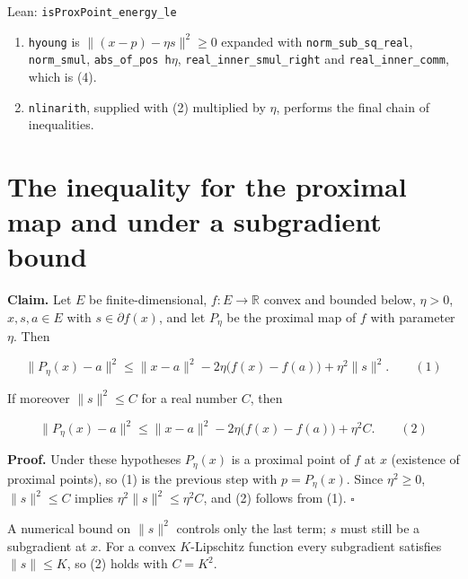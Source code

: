 \documentclass[11pt,a4paper]{article}
\begin{document}
\begin{leanbox}{Lean: \texttt{isProxPoint\_\allowbreak{}energy\_\allowbreak{}le}}
\begin{enumerate}
\item \texttt{hyoung} is \(\|(x-p)-\eta s\|^2\ge0\) expanded with \texttt{norm\_\allowbreak{}sub\_\allowbreak{}sq\_\allowbreak{}real}, \texttt{norm\_\allowbreak{}smul}, \texttt{abs\_\allowbreak{}of\_\allowbreak{}pos h\ensuremath{\eta}}, \texttt{real\_\allowbreak{}inner\_\allowbreak{}smul\_\allowbreak{}right} and \texttt{real\_\allowbreak{}inner\_\allowbreak{}comm}, which is (4).

\item \texttt{nlinarith}, supplied with (2) multiplied by \(\eta\), performs the final chain of inequalities.

\end{enumerate}
\end{leanbox}

\section{\texorpdfstring{The inequality for the proximal map and under a subgradient bound}{The inequality for the proximal map and under a subgradient bound}}


\textbf{Claim.} Let \(E\) be finite-dimensional, \(f:E\to\mathbb R\) convex and bounded below, \(\eta>0\), \(x,s,a\in E\) with \(s\in\partial f(x)\), and let \(P_\eta\) be the proximal map of \(f\) with parameter \(\eta\). Then


\[\|P_\eta(x)-a\|^2\le\|x-a\|^2-2\eta\bigl(f(x)-f(a)\bigr)+\eta^2\|s\|^2.\qquad(1)\]


If moreover \(\|s\|^2\le C\) for a real number \(C\), then


\[\|P_\eta(x)-a\|^2\le\|x-a\|^2-2\eta\bigl(f(x)-f(a)\bigr)+\eta^2C.\qquad(2)\]


\textbf{Proof.} Under these hypotheses \(P_\eta(x)\) is a proximal point of \(f\) at \(x\) (existence of proximal points), so (1) is the previous step with \(p=P_\eta(x)\). Since \(\eta^2\ge0\), \(\|s\|^2\le C\) implies \(\eta^2\|s\|^2\le\eta^2C\), and (2) follows from (1). \(\square\)




A numerical bound on \(\|s\|^2\) controls only the last term; \(s\) must still be a subgradient at \(x\). For a convex \(K\)-Lipschitz function every subgradient satisfies \(\|s\|\le K\), so (2) holds with \(C=K^2\).
\end{document}
